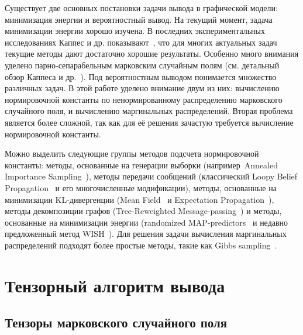 Существует две основных постановки задачи вывода в графической модели: минимизация энергии и вероятностный вывод.
На текущий момент, задача минимизации энергии хорошо изучена. В последних экспериментальных исследованиях Каппес и др. показывают~\cite{Kappes13comparison}, что для многих актуальных задач текущие методы дают достаточно хорошие результаты. Особенно много внимания уделено парно-сепарабельным марковским случайным полям (см. детальный обзор Каппеса и др.~\cite{Kappes13comparison}).
Под вероятностным выводом понимается множество различных задач. В этой работе уделено внимание двум из них: вычислению нормировочной константы по ненормированному распределению марковского случайного поля, и вычислению маргинальных распределений.
Вторая проблема является более сложной, так как для её решения зачастую требуется вычисление нормировочной константы.

Можно выделить следующие группы методов подсчета нормировочной константы: методы, основанные на генерации выборки (например~Annealed Importance Sampling~\cite{neal01ais,grosse13}), методы передачи сообщений (классический Loopy Belief Propagation~\cite{kschischang01bp} и его многочисленные модификации), методы, основанные на минимизации KL\hyp{}дивергенции (Mean Field~\cite{wainwright08gm} и Expectation Propagation~\cite{minka04treeep}), методы декомпозиции графов (Tree\hyp{}Reweighted Message-passing~\cite{wainwright05trw}) и методы, основанные на минимизации энергии (randomized MAP\hyp{}predictors~\cite{hazan13} и недавно предложенный метод WISH~\cite{ermon13wish}).
Для решения задачи вычисления маргинальных распределений подходят более простые методы, такие как Gibbs sampling~\cite{wainwright08gm}.

\section{Тензорный алгоритм вывода} \label{sec:tt-mrf}
\subsection{Тензоры марковского случайного поля} \label{sec:mrf-as-tensor}


